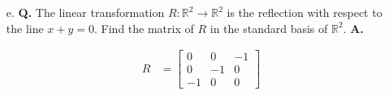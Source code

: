 \documentclass[main.tex]{subfiles}
\begin{document}
\begin{enumerate}
\begin{enumerate}
    
    \item [e.] \textbf{Q.} The linear transformation $R: \mathbb{R}^{2} \longrightarrow \mathbb{R}^{2}$ is the reflection with respect to the line $x+y=0$. Find the matrix of $R$ in the standard basis of $\mathbb{R}^{2}$.
    \textbf{A.}

    $$
    \begin{aligned}
    R &=\left[\begin{array}{lll}
    0 & 0 & -1 \\
    0 & -1 & 0 \\
    -1 & 0 & 0    
    \end{array}\right]
    \end{aligned}
    $$
    
    \end{enumerate}

\end{enumerate}
\end{document}
